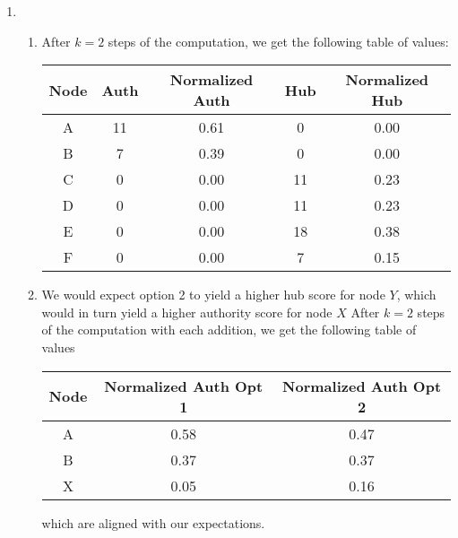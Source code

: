\documentclass{article}
\begin{document}
\begin{enumerate}
    \item \begin{enumerate}
        \item After $k=2$ steps of the computation, we get the following table of values:
        \begin{center}\begin{tabular}{||c | c | c | c | c||} 
            \hline
            Node & Auth & Normalized Auth & Hub & Normalized Hub \\ [0.5ex] 
            \hline\hline
            A & 11 & 0.61 & 0 & 0.00 \\
            \hline
            B & 7 & 0.39 & 0 & 0.00 \\
            \hline
            C & 0 & 0.00 & 11 & 0.23 \\
            \hline
            D & 0 & 0.00 & 11 & 0.23 \\
            \hline
            E & 0 & 0.00 & 18 & 0.38 \\
            \hline 
            F & 0 & 0.00 & 7 & 0.15 \\
            \hline
        \end{tabular}\end{center}

        \pagebreak

        \item We would expect option 2 to yield a higher hub score for node $Y$, which would in turn yield a higher authority score for node $X$ After $k=2$ steps of the computation with each addition, we get the following table of values
        \begin{center}\begin{tabular}{||c | c | c||} 
            \hline
            Node & Normalized Auth Opt 1 & Normalized Auth Opt 2 \\ [0.5ex] 
            \hline\hline
            A & 0.58 & 0.47 \\
            \hline
            B & 0.37 & 0.37 \\
            \hline
            X & 0.05 & 0.16 \\
            \hline
        \end{tabular}\end{center}
        which are aligned with our expectations.


\end{enumerate}
\end{enumerate}
\end{document}
